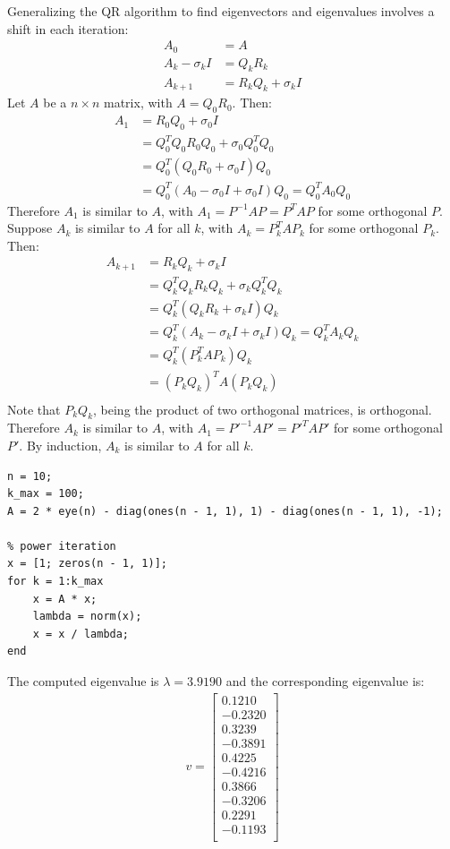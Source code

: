 \documentclass{article}
\begin{document}
\clearpage
\problem{}
Generalizing the QR algorithm to find eigenvectors and eigenvalues involves a shift in each iteration:
\begin{align*}
    A_0 & = A \\
    A_k - \sigma_k I & = Q_k R_k \\
    A_{k + 1} & = R_k Q_k + \sigma_k I
\end{align*}
Let $A$ be a $n \times n$ matrix, with $A = Q_0 R_0$. Then:
\begin{align*}
    A_1 & = R_0Q_0 + \sigma_0 I \\
    & = Q_0^T Q_0 R_0Q_0 + \sigma_0 Q_0^T Q_0 \\
    & = Q_0^T (Q_0R_0 + \sigma_0 I) Q_0 \\
    & = Q_0^T (A_0 - \sigma_0 I + \sigma_0 I) Q_0 = Q_0^T A_0 Q_0
\end{align*}
Therefore $A_1$ is similar to $A$, with $A_1 = P^{-1}AP = P^T A P$ for some orthogonal $P$. Suppose $A_k$ is similar to $A$ for all $k$, with $A_k = P_k^T AP_k$ for some orthogonal $P_k$. Then:
\begin{align*}
    A_{k + 1} & = R_k Q_k + \sigma_k I \\
    & = Q_k^T Q_k R_k Q_k + \sigma_k Q_k^T Q_k \\
    & = Q_k^T (Q_k R_k + \sigma_k I) Q_k \\
    & = Q_k^T (A_k - \sigma_k I + \sigma_k I) Q_k = Q_k^T A_k Q_k \\
    & = Q_k^T (P_k^T AP_k) Q_k \\
    & = {(P_k Q_k)}^T A (P_k Q_k) \\
\end{align*}
Note that $P_k Q_k$, being the product of two orthogonal matrices, is orthogonal. Therefore $A_k$ is similar to $A$, with $A_1 = {P'}^{-1}A{P'} = {P'}^T A P'$ for some orthogonal $P'$. By induction, $A_k$ is similar to $A$ for all $k$.

\clearpage
\problem{}
\begin{lstlisting}
n = 10;
k_max = 100;
A = 2 * eye(n) - diag(ones(n - 1, 1), 1) - diag(ones(n - 1, 1), -1);

% power iteration
x = [1; zeros(n - 1, 1)];
for k = 1:k_max
    x = A * x;
    lambda = norm(x);
    x = x / lambda;
end
\end{lstlisting}
The computed eigenvalue is $\lambda = 3.9190$ and the corresponding eigenvalue is:
\begin{align*}
    v = \begin{bmatrix}
        0.1210 \\
        -0.2320 \\
        0.3239 \\
        -0.3891 \\
        0.4225 \\
        -0.4216 \\
        0.3866 \\
        -0.3206 \\
        0.2291 \\
        -0.1193 \\
    \end{bmatrix}
\end{align*}
\end{document}
